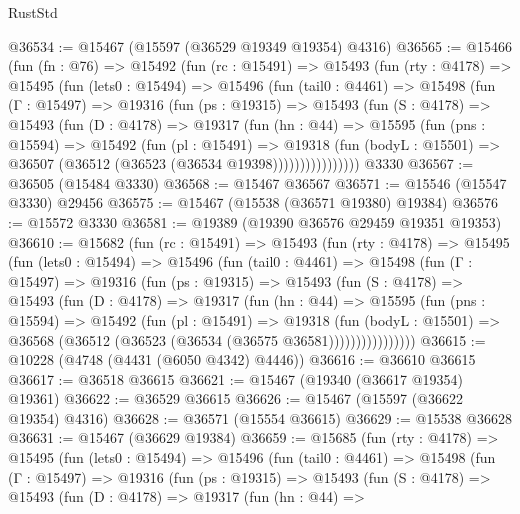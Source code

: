 \begin{lexlean}{RustStd}
\begin{coremodule}
@36534 := @15467 (@15597 (@36529 @19349 @19354) @4316)
@36565 := @15466
    (fun (fn : @76) =>
    @15492
      (fun (rc : @15491) =>
      @15493
        (fun (rty : @4178) =>
        @15495
          (fun (lets0 : @15494) =>
          @15496
            (fun (tail0 : @4461) =>
            @15498
              (fun (Γ : @15497) =>
              @19316
                (fun (ps : @19315) =>
                @15493
                  (fun (S : @4178) =>
                  @15493
                    (fun (D : @4178) =>
                    @19317
                      (fun (hn : @44) =>
                      @15595
                        (fun (pns : @15594) =>
                        @15492
                          (fun (pl : @15491) =>
                          @19318
                            (fun (bodyL : @15501) =>
                            @36507 (@36512 (@36523 (@36534 @19398))))))))))))))))
    @3330
@36567 := @36505 (@15484 @3330)
@36568 := @15467 @36567
@36571 := @15546 (@15547 @3330) @29456
@36575 := @15467 (@15538 (@36571 @19380) @19384)
@36576 := @15572 @3330
@36581 := @19389 (@19390 @36576 @29459 @19351 @19353)
@36610 := @15682
    (fun (rc : @15491) =>
    @15493
      (fun (rty : @4178) =>
      @15495
        (fun (lets0 : @15494) =>
        @15496
          (fun (tail0 : @4461) =>
          @15498
            (fun (Γ : @15497) =>
            @19316
              (fun (ps : @19315) =>
              @15493
                (fun (S : @4178) =>
                @15493
                  (fun (D : @4178) =>
                  @19317
                    (fun (hn : @44) =>
                    @15595
                      (fun (pns : @15594) =>
                      @15492
                        (fun (pl : @15491) =>
                        @19318
                          (fun (bodyL : @15501) =>
                          @36568 (@36512 (@36523 (@36534 (@36575 @36581))))))))))))))))
@36615 := @10228 (@4748 (@4431 (@6050 @4342) @4446))
@36616 := @36610 @36615
@36617 := @36518 @36615
@36621 := @15467 (@19340 (@36617 @19354) @19361)
@36622 := @36529 @36615
@36626 := @15467 (@15597 (@36622 @19354) @4316)
@36628 := @36571 (@15554 @36615)
@36629 := @15538 @36628
@36631 := @15467 (@36629 @19384)
@36659 := @15685
    (fun (rty : @4178) =>
    @15495
      (fun (lets0 : @15494) =>
      @15496
        (fun (tail0 : @4461) =>
        @15498
          (fun (Γ : @15497) =>
          @19316
            (fun (ps : @19315) =>
            @15493
              (fun (S : @4178) =>
              @15493
                (fun (D : @4178) =>
                @19317
                  (fun (hn : @44) =>

\end{coremodule}
\end{lexlean}

